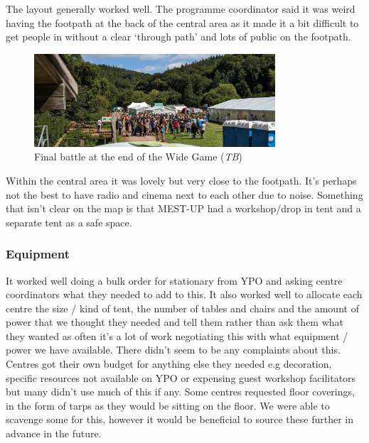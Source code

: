 
The layout generally worked well. The programme coordinator said it was weird having the footpath at the back of the central area as it made it a bit difficult to get people in without a clear `through path' and lots of public on the footpath.\\

\begin{figure}[ht]
    \centering
    \includegraphics[width=0.8\textwidth]{assets/wide-game-battle.jpg}
    \caption{Final battle at the end of the Wide Game (\textit{TB})}
\end{figure}

Within the central area it was lovely but very close to the footpath. It's perhaps not the best to have radio and cinema next to each other due to noise. Something that isn't clear on the map is that MEST-UP had a workshop/drop in tent and a separate tent as a safe space.
\subsubsection{Equipment}
It worked well doing a bulk order for stationary from YPO and asking centre coordinators what they needed to add to this. It also worked well to allocate each centre the size / kind of tent, the number of tables and chairs and the amount of power that we thought they needed and tell them rather than ask them what they wanted as often it's a lot of work negotiating this with what equipment / power we have available. There didn't seem to be any complaints about this. Centres got their own budget for anything else they needed e.g decoration, specific resources not available on YPO or expensing guest workshop facilitators but many didn't use much of this if any. Some centres requested floor coverings, in the form of tarps as they would be sitting on the floor. We were able to scavenge some for this, however it would be beneficial to source these further in advance in the future.
